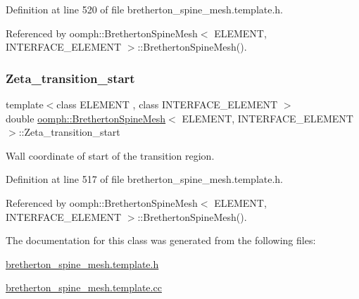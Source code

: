 Definition at line 520 of file bretherton\+\_\+spine\+\_\+mesh.\+template.\+h.



Referenced by oomph\+::\+Bretherton\+Spine\+Mesh$<$ E\+L\+E\+M\+E\+N\+T, I\+N\+T\+E\+R\+F\+A\+C\+E\+\_\+\+E\+L\+E\+M\+E\+N\+T $>$\+::\+Bretherton\+Spine\+Mesh().

\mbox{\label{classoomph_1_1BrethertonSpineMesh_af701937d59d7804f40cb1b4c7a262391}} 
\subsubsection{\texorpdfstring{Zeta\+\_\+transition\+\_\+start}{Zeta\_transition\_start}}
{\footnotesize\ttfamily template$<$class E\+L\+E\+M\+E\+NT , class I\+N\+T\+E\+R\+F\+A\+C\+E\+\_\+\+E\+L\+E\+M\+E\+NT $>$ \\
double \hyperlink{classoomph_1_1BrethertonSpineMesh}{oomph\+::\+Bretherton\+Spine\+Mesh}$<$ E\+L\+E\+M\+E\+NT, I\+N\+T\+E\+R\+F\+A\+C\+E\+\_\+\+E\+L\+E\+M\+E\+NT $>$\+::Zeta\+\_\+transition\+\_\+start\hspace{0.3cm}{\ttfamily [protected]}}



Wall coordinate of start of the transition region. 



Definition at line 517 of file bretherton\+\_\+spine\+\_\+mesh.\+template.\+h.



Referenced by oomph\+::\+Bretherton\+Spine\+Mesh$<$ E\+L\+E\+M\+E\+N\+T, I\+N\+T\+E\+R\+F\+A\+C\+E\+\_\+\+E\+L\+E\+M\+E\+N\+T $>$\+::\+Bretherton\+Spine\+Mesh().



The documentation for this class was generated from the following files\+:\begin{DoxyCompactItemize}
\item 
\hyperlink{bretherton__spine__mesh_8template_8h}{bretherton\+\_\+spine\+\_\+mesh.\+template.\+h}\item 
\hyperlink{bretherton__spine__mesh_8template_8cc}{bretherton\+\_\+spine\+\_\+mesh.\+template.\+cc}\end{DoxyCompactItemize}
